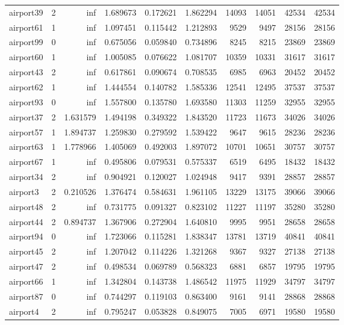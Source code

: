 \begin{longtable}{|l|r|r|r|r|r|r|r|r|r|}
airport39 & 2 & inf & 1.689673 & 0.172621 & 1.862294 & 14093 & 14051 & 42534 & 42534 \\
airport61 & 1 & inf & 1.097451 & 0.115442 & 1.212893 & 9529 & 9497 & 28156 & 28156 \\
airport99 & 0 & inf & 0.675056 & 0.059840 & 0.734896 & 8245 & 8215 & 23869 & 23869 \\
airport60 & 1 & inf & 1.005085 & 0.076622 & 1.081707 & 10359 & 10331 & 31617 & 31617 \\
airport43 & 2 & inf & 0.617861 & 0.090674 & 0.708535 & 6985 & 6963 & 20452 & 20452 \\
airport62 & 1 & inf & 1.444554 & 0.140782 & 1.585336 & 12541 & 12495 & 37537 & 37537 \\
airport93 & 0 & inf & 1.557800 & 0.135780 & 1.693580 & 11303 & 11259 & 32955 & 32955 \\
airport37 & 2 & 1.631579 & 1.494198 & 0.349322 & 1.843520 & 11723 & 11673 & 34026 & 34026 \\
airport57 & 1 & 1.894737 & 1.259830 & 0.279592 & 1.539422 & 9647 & 9615 & 28236 & 28236 \\
airport63 & 1 & 1.778966 & 1.405069 & 0.492003 & 1.897072 & 10701 & 10651 & 30757 & 30757 \\
airport67 & 1 & inf & 0.495806 & 0.079531 & 0.575337 & 6519 & 6495 & 18432 & 18432 \\
airport34 & 2 & inf & 0.904921 & 0.120027 & 1.024948 & 9417 & 9391 & 28857 & 28857 \\
airport3 & 2 & 0.210526 & 1.376474 & 0.584631 & 1.961105 & 13229 & 13175 & 39066 & 39066 \\
airport48 & 2 & inf & 0.731775 & 0.091327 & 0.823102 & 11227 & 11197 & 35280 & 35280 \\
airport44 & 2 & 0.894737 & 1.367906 & 0.272904 & 1.640810 & 9995 & 9951 & 28658 & 28658 \\
airport94 & 0 & inf & 1.723066 & 0.115281 & 1.838347 & 13781 & 13719 & 40841 & 40841 \\
airport45 & 2 & inf & 1.207042 & 0.114226 & 1.321268 & 9367 & 9327 & 27138 & 27138 \\
airport47 & 2 & inf & 0.498534 & 0.069789 & 0.568323 & 6881 & 6857 & 19795 & 19795 \\
airport66 & 1 & inf & 1.342804 & 0.143738 & 1.486542 & 11975 & 11929 & 34797 & 34797 \\
airport87 & 0 & inf & 0.744297 & 0.119103 & 0.863400 & 9161 & 9141 & 28868 & 28868 \\
airport4 & 2 & inf & 0.795247 & 0.053828 & 0.849075 & 7005 & 6971 & 19580 & 19580 \\

\end{longtable}
